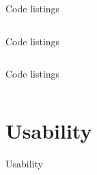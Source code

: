 \documentclass[compress,aspectratio=169]{beamer}
\begin{document}
\begin{frame}[fragile]{Code listings}
        \footnotesize\inputminted[xleftmargin=1em,linenos,fontsize=\scriptsize, firstline=1,lastline=16]{python}{../../data/scap_gtx1080_deepspeed_14615344_4294967294_one-epoch.txt}

\end{frame}

\begin{frame}[fragile]{Code listings}
        \footnotesize\inputminted[xleftmargin=1em,linenos,fontsize=\scriptsize, firstline=18,lastline=31]{python}{../../data/scap_gtx1080_deepspeed_14615344_4294967294_one-epoch.txt}

\end{frame}

\begin{frame}[fragile]{Code listings}
        \footnotesize\inputminted[xleftmargin=1em,linenos,fontsize=\tiny, firstline=33,lastline=48, breaklines]{python}{../../data/scap_gtx1080_deepspeed_14615344_4294967294_one-epoch.txt}

\end{frame}

\section{Usability}

\begin{frame}{Usability}
\end{frame}
\end{document}
